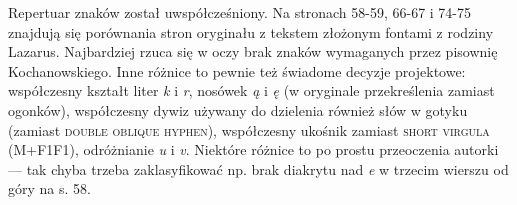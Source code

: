 Repertuar znaków został uwspółcześniony. Na stronach 58-59, 66-67 i
74-75 znajdują się porównania stron oryginału z tekstem złożonym
fontami z rodziny Lazarus. Najbardziej rzuca się w oczy brak znaków
wymaganych przez pisownię Kochanowskiego. Inne różnice to pewnie też
świadome decyzje projektowe: współczesny kształt liter \textit{k} i
\textit{r}, nosówek \textit{ą} i \textit{ę} (w oryginale przekreślenia
zamiast ogonków), współczesny dywiz używany do dzielenia również słów
w gotyku (zamiast \textsc{double oblique hyphen}), współczesny ukośnik
zamiast \label{virgula}\textsc{short virgula} (M+F1F1), odróżnianie
\textit{u} i \textit{v}. Niektóre różnice to po prostu przeoczenia
autorki --- tak chyba trzeba zaklasyfikować np. brak diakrytu nad
\textit{e} w trzecim wierszu od góry na s. 58.




